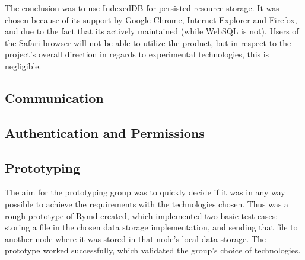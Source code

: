 The conclusion was to use IndexedDB for persisted resource storage. It was chosen because of its support by Google Chrome, Internet Explorer and Firefox, and due to the fact that its actively maintained (while WebSQL is not). Users of the Safari browser will not be able to utilize the product, but in respect to the project's overall direction in regards to experimental technologies, this is negligible.

\subsection{Communication}


\subsection{Authentication and Permissions}


\subsection{Prototyping}
The aim for the prototyping group was to quickly decide if it was in any way possible to achieve the requirements with the technologies chosen. Thus was a rough prototype of Rymd created, which implemented two basic test cases: storing a file in the chosen data storage implementation, and sending that file to another node where it was stored in that node's local data storage. The prototype worked successfully, which validated the group's choice of technologies.
